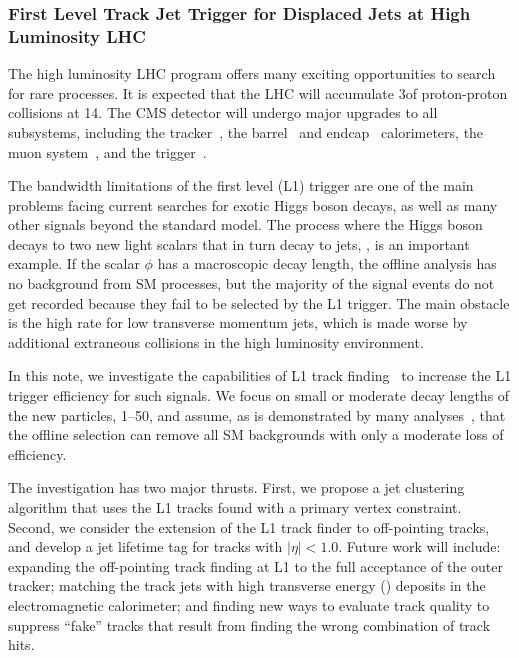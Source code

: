 \subsubsection{First Level Track Jet Trigger for Displaced Jets at High Luminosity LHC}

The high luminosity LHC program offers many exciting opportunities to search for rare processes. It is expected that the
LHC will accumulate 3\abinv of proton-proton collisions at 14\UTeV.
The CMS detector will undergo major upgrades to all subsystems, including the tracker~\cite{cmstdr-014},
the barrel~\cite{cmstdr-barrel} and endcap~\cite{cmstdr-ec} calorimeters, the muon system~\cite{cmstdr-mu},
and the trigger~\cite{cmstdr-017}. 

The bandwidth limitations of the first level (L1) trigger
are one of the main problems facing current searches 
for exotic Higgs boson decays, as well as many other signals beyond the standard model.
The process where the Higgs boson decays to two new light scalars that in turn decay to jets, \Hphiphi, is an important example. If the scalar $\phi$ has a
macroscopic decay length, the offline analysis has no background from SM processes, but the majority of the signal events do not get recorded because they fail to be selected by the L1 trigger.
The main obstacle is the high rate for low transverse momentum jets, which is made worse by additional extraneous \pp collisions in the
high luminosity environment.

In this note, we investigate the capabilities of L1 track finding~\cite{cmstdr-014} to increase the L1 trigger efficiency for such signals.
We focus on small or moderate decay lengths of the new particles, 1--50\Umm, and assume, as is demonstrated by
many analyses~\cite{ll1, ll2, ll3}, that the offline selection can remove all SM backgrounds with only a moderate loss of efficiency.

The investigation has two major thrusts. First, we propose a jet clustering algorithm that uses the L1 tracks found with a primary vertex constraint.
Second, we consider the extension of the L1
track finder to off-pointing tracks, and develop a jet lifetime tag for tracks with $|\eta| < 1.0$. 
Future work will include: expanding the off-pointing track finding at L1 to the full acceptance of the outer tracker;
matching the track jets with high transverse energy (\ET) deposits in the electromagnetic calorimeter; and finding new ways to evaluate
track quality to suppress ``fake'' tracks that result from finding the wrong combination of track hits. 

